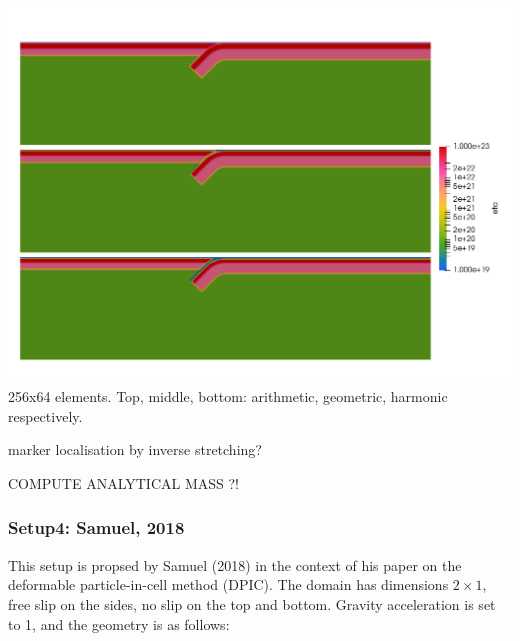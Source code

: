 \begin{center}
\includegraphics[width=14cm]{python_codes/fieldstone_67/images/eta_123}\\
{\captionfont 256x64 elements. Top, middle, bottom: arithmetic, geometric, harmonic respectively.}
\end{center}


marker localisation by inverse stretching?

COMPUTE ANALYTICAL MASS ?!

\newpage
\subsubsection*{Setup4: Samuel, 2018}

This setup is propsed by Samuel (2018) \cite{samu18} in the context of his paper on the deformable particle-in-cell method (DPIC).
The domain has dimensions $2 \times 1$, free slip on the sides, no slip on the top and bottom. Gravity acceleration is set to 1, 
and the geometry is as follows:

